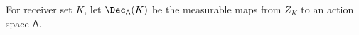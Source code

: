 For receiver set $K$, let $\Dec_{\mathsf A}(K)$ be the measurable maps from $Z_K$ to an action space $\mathsf A$.
